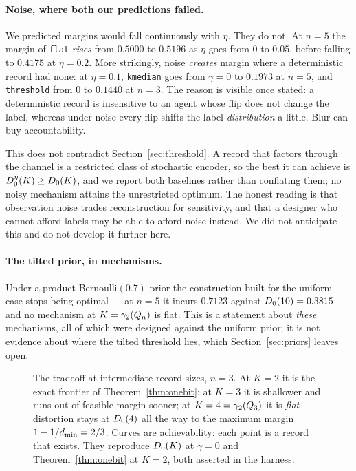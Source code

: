 \paragraph{Noise, where both our predictions failed.}
We predicted margins would fall continuously with $\eta$. They do not. At
$n = 5$ the margin of \texttt{flat} \emph{rises} from $0.5000$ to $0.5196$ as
$\eta$ goes from $0$ to $0.05$, before falling to $0.4175$ at $\eta = 0.2$. More
strikingly, noise \emph{creates} margin where a deterministic record had none: at
$\eta = 0.1$, \texttt{kmedian} goes from $\gamma = 0$ to $0.1973$ at $n=5$, and
\texttt{threshold} from $0$ to $0.1440$ at $n=3$. The reason is visible once
stated: a deterministic record is insensitive to an agent whose flip does not
change the label, whereas under noise every flip shifts the label
\emph{distribution} a little. Blur can buy accountability.

This does not contradict Section~\ref{sec:threshold}. A record that factors
through the channel is a restricted class of stochastic encoder, so the best it
can achieve is $D_0^{\eta}(K) \ge D_0(K)$, and we report both baselines
rather than conflating them; no noisy mechanism attains the unrestricted
optimum. The honest reading is that observation noise trades reconstruction for
sensitivity, and that a designer who cannot afford labels may be able to afford
noise instead. We did not anticipate this and do not develop it further here.

\paragraph{The tilted prior, in mechanisms.}
Under a product Bernoulli$(0.7)$ prior the construction built for the uniform
case stops being optimal --- at $n=5$ it incurs $0.7123$ against $D_0(10) =
0.3815$ --- and no mechanism at $K = \gamma_2(Q_n)$ is flat. This is a statement
about \emph{these} mechanisms, all of which were designed against the uniform
prior; it is not evidence about where the tilted threshold lies, which
Section~\ref{sec:priors} leaves open.


\begin{figure}[t]
\centering

\caption{The tradeoff at intermediate record sizes, $n = 3$. At $K=2$ it is
the exact frontier of Theorem~\ref{thm:onebit}; at $K=3$ it is shallower and
runs out of feasible margin sooner; at $K = 4 = \gamma_2(Q_3)$ it is
\emph{flat}---distortion stays at $D_0(4)$ all the way to the maximum
margin $1-1/d_{\min} = 2/3$. Curves are achievability: each point is a record
that exists. They reproduce $D_0(K)$ at $\gamma=0$ and Theorem~\ref{thm:onebit} at $K=2$, both asserted in the harness.}
\label{fig:frontierK}
\end{figure}

